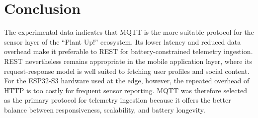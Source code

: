 \section{Conclusion}
The experimental data indicates that MQTT is the more suitable protocol for the sensor layer of the ``Plant Up!'' ecosystem. Its lower latency and reduced data overhead make it preferable to REST for battery-constrained telemetry ingestion. REST nevertheless remains appropriate in the mobile application layer, where its request-response model is well suited to fetching user profiles and social content. For the ESP32-S3 hardware used at the edge, however, the repeated overhead of HTTP is too costly for frequent sensor reporting. MQTT was therefore selected as the primary protocol for telemetry ingestion because it offers the better balance between responsiveness, scalability, and battery longevity.
